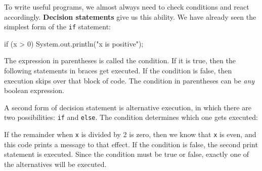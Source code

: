 \documentclass[12pt]{book}
\theoremstyle{exercise}
\newcommand{\java}[1]{\lstinline{#1}} %
\begin{document}
To write useful programs, we almost always need to check conditions and react accordingly.
{\bf Decision statements} give us this ability.
We have already seen the simplest form of the \java{if} statement:

\begin{code}
    if (x > 0) {
        System.out.println("x is positive");
    }
\end{code}

The expression in parentheses is called the condition.
If it is true, then the following statements in braces get executed.
If the condition is false, then execution skips over that block of code.
The condition in parentheses can be {\it any} boolean expression.


A second form of decision statement is alternative execution, in which there are two possibilities: \java{if} and \java{else}.
The condition determines which one gets executed:


If the remainder when {\tt x} is divided by 2 is zero, then we know that {\tt x} is even, and this code prints a message to that effect.
If the condition is false, the second print statement is executed.
Since the condition must be true or false, exactly one of the alternatives will be executed.

%
%
%
%
%
%
\end{document}
